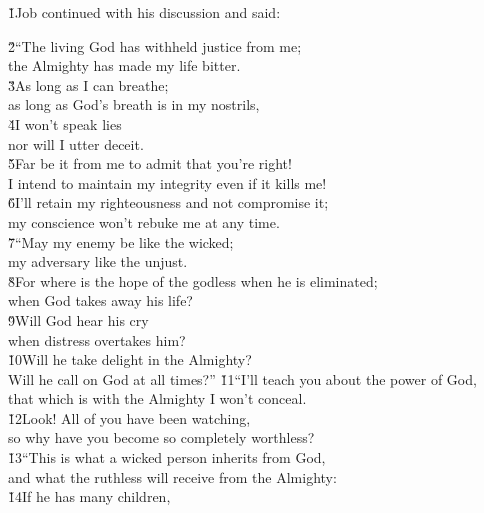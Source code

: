\v{1}Job continued with his discussion and said:

\begin{poetry}
\poeml \v{2}``The living God has withheld justice from me; \\
\poemll    the Almighty has made my life bitter. \\
\poeml \v{3}As long as I can breathe; \\
\poemll    as long as God's breath is in my nostrils, \\
\poeml \v{4}I won't speak lies \\
\poemll    nor will I utter deceit. \\
\poeml \v{5}Far be it from me to admit that you're right! \\
\poemll    I intend to maintain my integrity even if it kills me! \\
\poeml \v{6}I'll retain my righteousness and not compromise it; \\
\poemll    my conscience won't rebuke me at any time. \\
\poeml \v{7}``May my enemy be like the wicked; \\
\poemll    my adversary like the unjust. \\
\poeml \v{8}For where is the hope of the godless when he is eliminated; \\
\poemll    when God takes away his life? \\
\poeml \v{9}Will God hear his cry \\
\poemll    when distress overtakes him? \\
\poeml \v{10}Will he take delight in the Almighty? \\
\poemll    Will he call on God at all times?''
\poeml \v{11}``I'll teach you about the power of God, \\
\poemll    that which is with the Almighty I won't conceal. \\
\poeml \v{12}Look! All of you have been watching, \\
\poemll    so why have you become so completely worthless? \\
\poeml \v{13}``This is what a wicked person inherits from God, \\
\poemll    and what the ruthless will receive from the Almighty: \\
\poeml \v{14}If he has many children, \\

\end{poetry}
